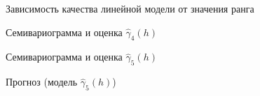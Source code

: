 \begin{figure}[H]
\caption{Зависимость качества линейной модели от значения ранга}
\label{img:lin-range-adapt}
\end{figure}

\begin{figure}[H]
\caption{Семивариограмма и оценка $ \widehat{\gamma}_4(h) $}
\label{img:lin-adapt-modeled}
\end{figure}

\begin{figure}[H]
\caption{Семивариограмма и оценка $ \widehat{\gamma}_5(h) $}
\label{img:sph-adapt-modeled}
\end{figure}

\begin{figure}[H]
\caption{Прогноз (модель $ \widehat{\gamma}_5(h) $)}
\label{img:sph-adapt-pred}
\end{figure}

